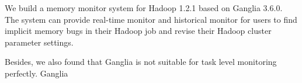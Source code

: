 We build a memory monitor system for Hadoop 1.2.1 based on Ganglia 3.6.0. The system can provide real-time monitor and historical monitor for users to find implicit memory bugs in their Hadoop job and revise their Hadoop cluster parameter settings.

Besides, we also found that Ganglia is not suitable for task level monitoring perfectly. Ganglia 
